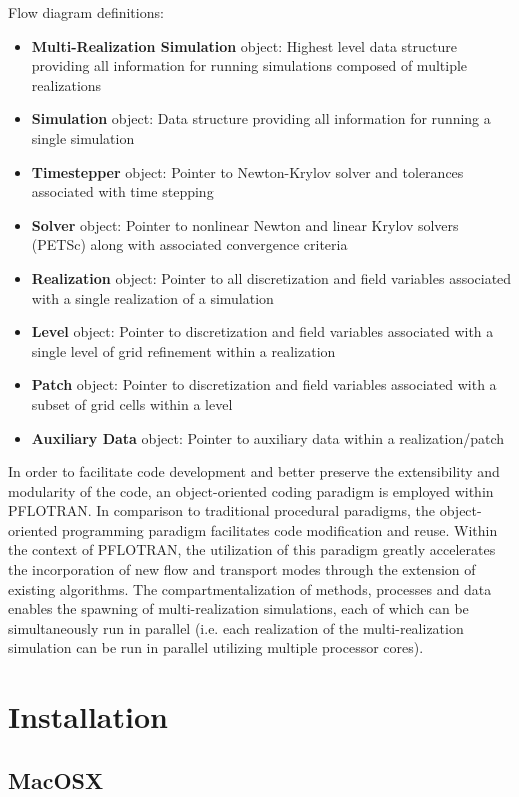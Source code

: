 \documentclass[12pt]{article}
\begin{document}
Flow diagram definitions:
\begin{itemize}
\item {\bf Multi-Realization Simulation} object: Highest level data structure providing all information for running simulations composed of multiple realizations
\item {\bf Simulation} object: Data structure providing all information for running a single simulation
\item {\bf Timestepper} object: Pointer to Newton-Krylov solver and tolerances associated with time stepping
\item {\bf Solver} object: Pointer to nonlinear Newton and linear Krylov solvers (PETSc) along with associated convergence criteria
\item {\bf Realization} object: Pointer to all discretization and field variables associated with a single realization of a simulation
\item {\bf Level} object: Pointer to discretization and field variables associated with a single level of grid refinement within a realization
\item {\bf Patch} object: Pointer to discretization and field variables associated with a subset of grid cells within a level
\item {\bf Auxiliary Data} object: Pointer to auxiliary data within a realization/patch
\end{itemize}


In order to facilitate code development and better preserve the extensibility and modularity of the code, an object-oriented coding paradigm is employed within PFLOTRAN.  In comparison to traditional procedural paradigms, the object-oriented programming paradigm facilitates code modification and reuse.  Within the context of PFLOTRAN, the utilization of this paradigm greatly accelerates the incorporation of new flow and transport modes through the extension of existing algorithms.  The compartmentalization of methods, processes and data enables the spawning of multi-realization simulations, each of which can be simultaneously run in parallel (i.e. each realization of the multi-realization simulation can be run in parallel utilizing multiple processor cores).

\section{Installation}

\subsection{MacOSX}
\end{document}
